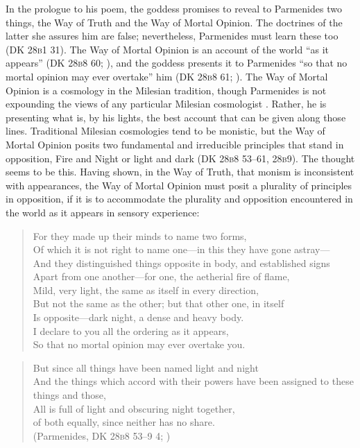 In the prologue to his poem, the goddess promises to reveal to Parmenides two things, the Way of Truth and the Way of Mortal Opinion. The doctrines of the latter she assures him are false; nevertheless, Parmenides must learn these too (DK 28\textsc{b}1 31). The Way of Mortal Opinion is an account of the world ``as it appears'' (DK 28\textsc{b}8 60; \citealt[155]{McKirahan:1994ve}), and the goddess presents it to Parmenides ``so that no mortal opinion may ever overtake'' him (DK 28\textsc{b}8 61; \citealt[155]{McKirahan:1994ve}). The Way of Mortal Opinion is a cosmology in the Milesian tradition, though Parmenides is not expounding the views of any particular Milesian cosmologist \citep[on Parmenides and Milesian cosmology see][]{Kahn:1994qf}. Rather, he is presenting what is, by his lights, the best account that can be given along those lines. Traditional Milesian cosmologies tend to be monistic, but the Way of Mortal Opinion posits two fundamental and irreducible principles that stand in opposition, Fire and Night or light and dark (DK 28\textsc{b}8 53--61, 28\textsc{b}9). The thought seems to be this. Having shown, in the Way of Truth, that monism is inconsistent with appearances, the Way of Mortal Opinion must posit a plurality of principles in opposition, if it is to accommodate the plurality and opposition encountered in the world as it appears in sensory experience:
\begin{verse}
    For they made up their minds to name two forms,\\ 
    Of which it is not right to name one---in this they have gone astray---\\
    And they distinguished things opposite in body, and established signs\\
    Apart from one another---for one, the aetherial fire of flame,\\
    Mild, very light, the same as itself in every direction,\\
    But not the same as the other; but that other one, in itself\\
    Is opposite---dark night, a dense and heavy body.\\
    I declare to you all the ordering as it appears,\\
    So that no mortal opinion may ever overtake you.
\end{verse}
\begin{verse}
    But since all things have been named light and night\\
    And the things which accord with their powers have been assigned to these things and those,\\
    All is full of light and obscuring night together,\\
    of both equally, since neither has no share.\\
    (Parmenides, DK 28\textsc{b}8 53--9 4; \citealt[155]{McKirahan:1994ve})
\end{verse}
